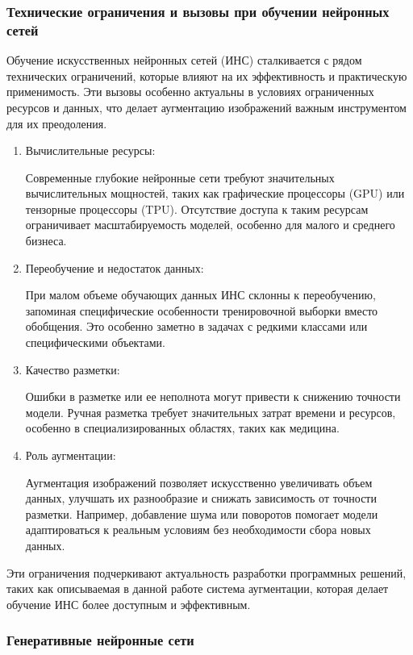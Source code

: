 \subsubsection{Технические ограничения и вызовы при обучении нейронных сетей}

Обучение искусственных нейронных сетей (ИНС) сталкивается с рядом технических ограничений, которые влияют на их эффективность и практическую применимость. Эти вызовы особенно актуальны в условиях ограниченных ресурсов и данных, что делает аугментацию изображений важным инструментом для их преодоления.

\begin{enumerate}
	\item Вычислительные ресурсы:
	
	Современные глубокие нейронные сети требуют значительных вычислительных мощностей, таких как графические процессоры (GPU) или тензорные процессоры (TPU). Отсутствие доступа к таким ресурсам ограничивает масштабируемость моделей, особенно для малого и среднего бизнеса.
	\item Переобучение и недостаток данных: 
	
	При малом объеме обучающих данных ИНС склонны к переобучению, запоминая специфические особенности тренировочной выборки вместо обобщения. Это особенно заметно в задачах с редкими классами или специфическими объектами.
	\item Качество разметки: 
	
	Ошибки в разметке или ее неполнота могут привести к снижению точности модели. Ручная разметка требует значительных затрат времени и ресурсов, особенно в специализированных областях, таких как медицина.
	\item Роль аугментации:
	
	Аугментация изображений позволяет искусственно увеличивать объем данных, улучшать их разнообразие и снижать зависимость от точности разметки. Например, добавление шума или поворотов помогает модели адаптироваться к реальным условиям без необходимости сбора новых данных.
\end{enumerate}

Эти ограничения подчеркивают актуальность разработки программных решений, таких как описываемая в данной работе система аугментации, которая делает обучение ИНС более доступным и эффективным.

\subsubsection{Генеративные нейронные сети}

